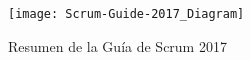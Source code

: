 \begin{figure}[h]
  \centering
  \texttt{[image: Scrum-Guide-2017\_Diagram]}
  \caption{Resumen de la Guía de Scrum 2017}
  \centering
  \label{fig:Scrum-Guide-2017_Diagram} %
\end{figure}
\FloatBarrier %

